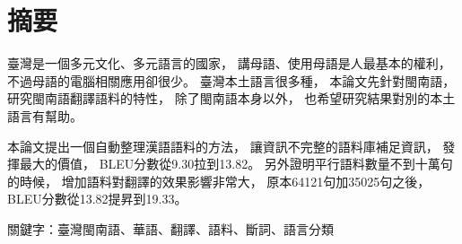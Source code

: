 \chapter{摘要}
臺灣是一個多元文化、多元語言的國家，
講母語、使用母語是人最基本的權利，
不過母語的電腦相關應用卻很少。
臺灣本土語言很多種，
本論文先針對閩南語，
研究閩南語翻譯語料的特性，
除了閩南語本身以外，
也希望研究結果對別的本土語言有幫助。

本論文提出一個自動整理漢語語料的方法，
讓資訊不完整的語料庫補足資訊，
發揮最大的價值，
BLEU分數從9.30拉到13.82。
另外證明平行語料數量不到十萬句的時候，
增加語料對翻譯的效果影響非常大，
原本64121句加35025句之後，
BLEU分數從13.82提昇到19.33。

關鍵字：臺灣閩南語、華語、翻譯、語料、斷詞、語言分類
